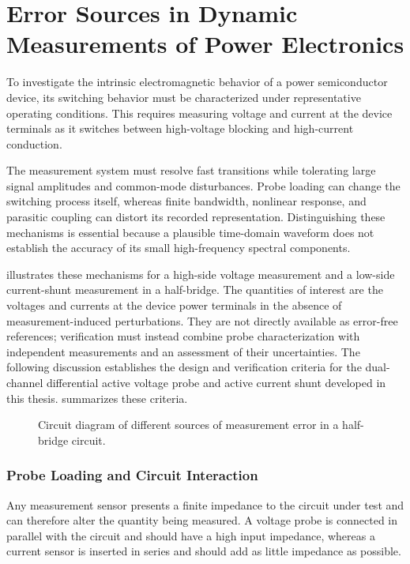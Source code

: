 \section{Error Sources in Dynamic Measurements of Power Electronics}
\label{sec:fundamental_measurement_errors}
To investigate the intrinsic electromagnetic behavior of a power semiconductor device, its switching behavior must be characterized under representative operating conditions. 
This requires measuring voltage and current at the device terminals as it switches between high-voltage blocking and high-current conduction.

The measurement system must resolve fast transitions while tolerating large signal amplitudes and common-mode disturbances.
Probe loading can change the switching process itself, whereas finite bandwidth, nonlinear response, and parasitic coupling can distort its recorded representation.
Distinguishing these mechanisms is essential because a plausible time-domain waveform does not establish the accuracy of its small high-frequency spectral components.

 illustrates these mechanisms for a high-side voltage measurement and a low-side current-shunt measurement in a half-bridge.
The quantities of interest are the voltages and currents at the device power terminals in the absence of measurement-induced perturbations.
They are not directly available as error-free references; verification must instead combine probe characterization with independent measurements and an assessment of their uncertainties.
The following discussion establishes the design and verification criteria for the dual-channel differential active voltage probe and active current shunt developed in this thesis.
 summarizes these criteria.

\begin{figure}
	\caption{Circuit diagram of different sources of measurement error in a half-bridge circuit.}
	\label{fig:ESB_MeasurementError}
\end{figure}

\subsubsection*{Probe Loading and Circuit Interaction}
Any measurement sensor presents a finite impedance to the circuit under test and can therefore alter the quantity being measured. 
A voltage probe is connected in parallel with the circuit and should have a high input impedance, whereas a current sensor is inserted in series and should add as little impedance as possible.

